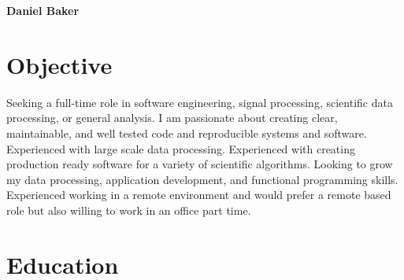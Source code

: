 



\textbf{\Huge Daniel Baker}

\begin{profile}
\end{profile}

\section{Objective}

\begin{blockquote}
    Seeking a full-time role in software engineering, signal processing, scientific data processing, or general analysis.
    I am passionate about creating clear, maintainable, and well tested code and reproducible systems and software.
    Experienced with large scale data processing.
    Experienced with creating production ready software for a variety of scientific algorithms.
    Looking to grow my data processing, application development, and functional programming skills.
    Experienced working in a remote environment and would prefer a remote based role but also willing to work in an office part time.
\end{blockquote}

\section{Education}

